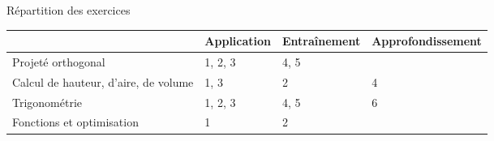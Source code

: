\documentclass[12pt]{beamer}
\begin{document}
\begin{frame}{Répartition des exercices}

\begin{center}
\begin{tabular}{|P{.2\textwidth}|P{.17\textwidth}|P{.2\textwidth}|P{.28\textwidth}|}\hline
		& Application & Entraînement & Approfondissement \\ \hline
	Projeté orthogonal & 1, 2, 3 & 4, 5 & \\ \hline
	Calcul de hauteur, d'aire, de volume & 1, 3 & 2 & 4 \\ \hline
	Trigonométrie & 1, 2, 3 & 4, 5 & 6 \\ \hline
	Fonctions et optimisation & 1 & 2 & \\ \hline
\end{tabular}
\end{center}

\end{frame}
\end{document}
